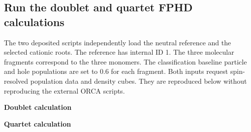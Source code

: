 \subsection{Run the doublet and quartet FPHD calculations}
The two deposited \progname{} scripts independently load the neutral reference and the selected cationic roots. The reference has internal ID 1. The three molecular fragments correspond to the three monomers. The classification baseline particle and hole populations are set to 0.6 for each fragment. Both inputs request spin-resolved population data and density cubes. They are reproduced below without reproducing the external ORCA scripts.

\noindent\textbf{Doublet calculation}


\noindent\textbf{Quartet calculation}

